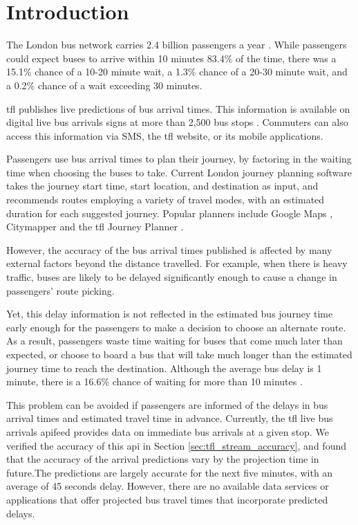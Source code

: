 \chapter{Introduction}

\par The London bus network carries 2.4 billion passengers a year \cite{tfl_annual_report_13/14}. While passengers could expect buses to arrive within 10 minutes 83.4\% of the time, there was a 15.1\% chance of a 10-20 minute wait, a 1.3\% chance of a 20-30 minute wait, and a 0.2\% chance of a wait exceeding 30 minutes.\cite{buses_performance_report}

\par \acrfull{tfl} publishes live predictions of bus arrival times. This information is available on digital live bus arrivals signs at more than 2,500 bus stops \cite{live_bus_arrivals}. Commuters can also access this information via SMS, the \acrshort{tfl} website, or its mobile applications.

\par Passengers use bus arrival times to plan their journey, by factoring in the waiting time when choosing the buses to take. Current London journey planning software takes the journey start time, start location, and destination as input, and recommends routes employing a variety of travel modes, with an estimated duration for each suggested journey. Popular planners include Google Maps \cite{google_maps}, Citymapper \cite{citymapper} and the \acrshort{tfl} Journey Planner \cite{tfl_journey_planner}.
\par However, the accuracy of the bus arrival times published is affected by many external factors beyond the distance travelled. For example, when there is heavy traffic, buses are likely to be delayed significantly enough to cause a change in passengers' route picking.

\par Yet, this delay information is not reflected in the estimated bus journey time early enough for the passengers to make a decision to choose an alternate route. As a result, passengers waste time waiting for buses that come much later than expected, or choose to board a bus that will take much longer than the estimated journey time to reach the destination. Although the average bus delay is 1 minute, there is a 16.6\% chance of waiting for more than 10 minutes \cite{buses_performance_data}.

\par This problem can be avoided if passengers are informed of the delays in bus arrival times and estimated travel time in advance. Currently, the \acrshort{tfl} live bus arrivals \acrfull{api}feed\cite{live_bus_arrivals} provides data on immediate bus arrivals at a given stop. We verified the accuracy of this \acrshort{api} in Section \ref{sec:tfl_stream_accuracy}, and found that the accuracy of the arrival predictions vary by the projection time in future.The predictions are largely accurate for the next five minutes, with an average of 45 seconds delay. However, there are no available data services or applications that offer projected bus travel times that incorporate predicted delays.

